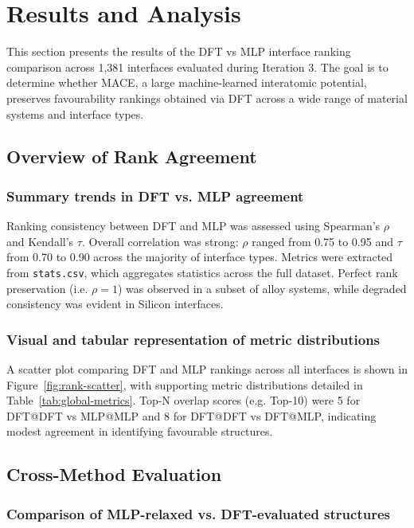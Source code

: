 \section{Results and Analysis} \label{section:results_and_analysis}

This section presents the results of the DFT vs MLP interface ranking comparison across 1,381 interfaces evaluated during Iteration 3. The goal is to determine whether MACE, a large machine-learned interatomic potential, preserves favourability rankings obtained via DFT across a wide range of material systems and interface types.

\subsection{Overview of Rank Agreement}

\subsubsection{Summary trends in DFT vs. MLP agreement}

Ranking consistency between DFT and MLP was assessed using Spearman's $\rho$ and Kendall's $\tau$. Overall correlation was strong: $\rho$ ranged from 0.75 to 0.95 and $\tau$ from 0.70 to 0.90 across the majority of interface types. Metrics were extracted from \texttt{stats.csv}, which aggregates statistics across the full dataset. Perfect rank preservation (i.e. $\rho = 1$) was observed in a subset of alloy systems, while degraded consistency was evident in Silicon interfaces.

\subsubsection{Visual and tabular representation of metric distributions}

A scatter plot comparing DFT and MLP rankings across all interfaces is shown in Figure~\ref{fig:rank-scatter}, with supporting metric distributions detailed in Table~\ref{tab:global-metrics}. Top-N overlap scores (e.g. Top-10) were 5 for DFT@DFT vs MLP@MLP and 8 for DFT@DFT vs DFT@MLP, indicating modest agreement in identifying favourable structures.

\subsection{Cross-Method Evaluation}

\subsubsection{Comparison of MLP-relaxed vs. DFT-evaluated structures}

